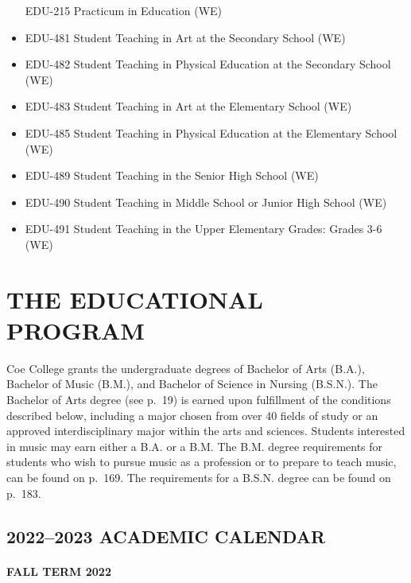 \documentclass[
  letterpaper,
]{scrbook}
\begin{document}
\begin{itemize}
  EDU-215 Practicum in Education (WE)
\item
  EDU-481 Student Teaching in Art at the Secondary School (WE)
\item
  EDU-482 Student Teaching in Physical Education at the Secondary School
  (WE)
\item
  EDU-483 Student Teaching in Art at the Elementary School (WE)
\item
  EDU-485 Student Teaching in Physical Education at the Elementary
  School (WE)
\item
  EDU-489 Student Teaching in the Senior High School (WE)
\item
  EDU-490 Student Teaching in Middle School or Junior High School (WE)
\item
  EDU-491 Student Teaching in the Upper Elementary Grades: Grades 3-6
  (WE)
\end{itemize}

\part{THE EDUCATIONAL PROGRAM}

Coe College grants the undergraduate degrees of Bachelor of Arts (B.A.),
Bachelor of Music (B.M.), and Bachelor of Science in Nursing (B.S.N.).
The Bachelor of Arts degree (see p.~19) is earned upon fulfillment of
the conditions described below, including a major chosen from over 40
fields of study or an approved interdisciplinary major within the arts
and sciences. Students interested in music may earn either a B.A. or a
B.M. The B.M. degree requirements for students who wish to pursue music
as a profession or to prepare to teach music, can be found on p.~169.
The requirements for a B.S.N. degree can be found on p.~183.

\hypertarget{academic-calendar-1}{%
\chapter*{2022--2023 ACADEMIC CALENDAR}\label{academic-calendar-1}}


\hypertarget{fall-term-2022-1}{%
\subsection*{FALL TERM 2022}\label{fall-term-2022-1}}
\end{document}
